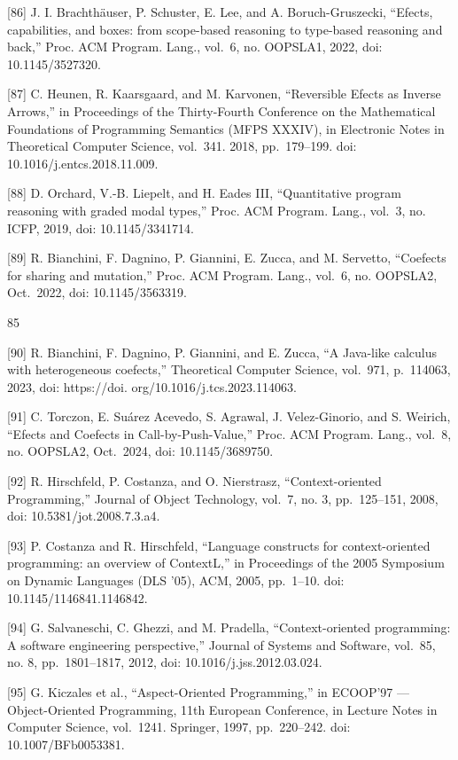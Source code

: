 \documentclass[
  10
]{article}
\begin{document}
{[}86{]} J. I. Brachthäuser, P. Schuster, E. Lee, and A.
Boruch-Gruszecki, ``Efects, capabilities, and boxes: from scope-based
reasoning to type-based reasoning and back,'' Proc. ACM Program. Lang.,
vol.~6, no. OOPSLA1, 2022, doi: 10.1145/3527320.

{[}87{]} C. Heunen, R. Kaarsgaard, and M. Karvonen, ``Reversible Efects
as Inverse Arrows,'' in Proceedings of the Thirty-Fourth Conference on
the Mathematical Foundations of Programming Semantics (MFPS XXXIV), in
Electronic Notes in Theoretical Computer Science, vol.~341. 2018,
pp.~179--199. doi: 10.1016/j.entcs.2018.11.009.

{[}88{]} D. Orchard, V.-B. Liepelt, and H. Eades III, ``Quantitative
program reasoning with graded modal types,'' Proc. ACM Program. Lang.,
vol.~3, no. ICFP, 2019, doi: 10.1145/3341714.

{[}89{]} R. Bianchini, F. Dagnino, P. Giannini, E. Zucca, and M.
Servetto, ``Coefects for sharing and mutation,'' Proc. ACM Program.
Lang., vol.~6, no. OOPSLA2, Oct.~2022, doi: 10.1145/3563319.

85

{[}90{]} R. Bianchini, F. Dagnino, P. Giannini, and E. Zucca, ``A
Java-like calculus with heterogeneous coefects,'' Theoretical Computer
Science, vol.~971, p.~114063, 2023, doi: https://doi.
org/10.1016/j.tcs.2023.114063.

{[}91{]} C. Torczon, E. Suárez Acevedo, S. Agrawal, J. Velez-Ginorio,
and S. Weirich, ``Efects and Coefects in Call-by-Push-Value,'' Proc. ACM
Program. Lang., vol.~8, no. OOPSLA2, Oct.~2024, doi: 10.1145/3689750.

{[}92{]} R. Hirschfeld, P. Costanza, and O. Nierstrasz,
``Context-oriented Programming,'' Journal of Object Technology, vol.~7,
no. 3, pp.~125--151, 2008, doi: 10.5381/jot.2008.7.3.a4.

{[}93{]} P. Costanza and R. Hirschfeld, ``Language constructs for
context-oriented programming: an overview of ContextL,'' in Proceedings
of the 2005 Symposium on Dynamic Languages (DLS '05), ACM, 2005,
pp.~1--10. doi: 10.1145/1146841.1146842.

{[}94{]} G. Salvaneschi, C. Ghezzi, and M. Pradella, ``Context-oriented
programming: A software engineering perspective,'' Journal of Systems
and Software, vol.~85, no. 8, pp.~1801--1817, 2012, doi:
10.1016/j.jss.2012.03.024.

{[}95{]} G. Kiczales et al., ``Aspect-Oriented Programming,'' in
ECOOP'97 --- Object-Oriented Programming, 11th European Conference, in
Lecture Notes in Computer Science, vol.~1241. Springer, 1997,
pp.~220--242. doi: 10.1007/BFb0053381.
\end{document}
